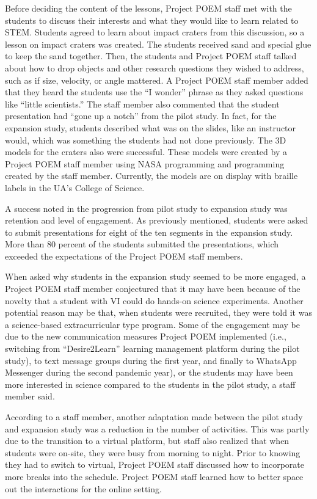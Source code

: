 \documentclass[11pt]{sig-alternate}
\begin{document}
\begin{large}
{Before deciding the content of the lessons, Project POEM staff met with the students to discuss their interests and what they would like to learn related to STEM. Students agreed to learn about impact craters from this discussion, so a lesson on impact craters was created. The students received sand and special glue to keep the sand together. Then, the students and Project POEM staff talked about how to drop objects and other research questions they wished to address, such as if size, velocity, or angle mattered. A Project POEM staff member added that they heard the students use the “I wonder” phrase as they asked questions like “little scientists.” The staff member also commented that the student presentation had “gone up a notch” from the pilot study. In fact, for the expansion study, students described what was on the slides, like an instructor would, which was something the students had not done previously. The 3D models for the craters also were successful. These models were created by a Project POEM staff member using NASA programming and programming created by the staff member. Currently, the models are on display with braille labels in the UA’s College of Science.

A success noted in the progression from pilot study to expansion study was retention and level of engagement. As previously mentioned, students were asked to submit presentations for eight of the ten segments in the expansion study. More than 80 percent of the students submitted the presentations, which exceeded the expectations of the Project POEM staff members. 

When asked why students in the expansion study seemed to be more engaged, a Project POEM staff member conjectured that it may have been because of the novelty that a student with VI could do hands-on science experiments. Another potential reason may be that, when students were recruited, they were told it was a science-based extracurricular type program. Some of the engagement may be due to the new communication measures Project POEM implemented (i.e., switching from “Desire2Learn” learning management platform during the pilot study), to text message groups during the first year, and finally to WhatsApp Messenger during the second pandemic year), or the students may have been more interested in science compared to the students in the pilot study, a staff member said. 

According to a staff member, another adaptation made between the pilot study and expansion study was a reduction in the number of activities. This was partly due to the transition to a virtual platform, but staff also realized that when students were on-site, they were busy from morning to night. Prior to knowing they had to switch to virtual, Project POEM staff discussed how to incorporate more breaks into the schedule. Project POEM staff learned how to better space out the interactions for the online setting.

}
\end{large}
\end{document}
